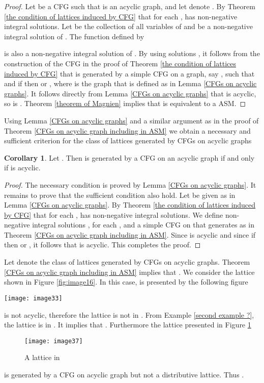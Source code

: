 \documentclass{article}
\theoremstyle{definition}
\newtheorem{coro}{Corollary}
\begin{document}
\begin{proof}
Let  be a CFG such that  is an acyclic graph, and let  denote . By Theorem \ref{the condition of lattices induced by CFG} that for each ,  has non-negative integral solutions. Let  be the collection of all variables of  and  be a non-negative integral solution of . The function  defined by

is also a non-negative integral solution of . By using solutions ,  it follows from the construction of the CFG in the proof of Theorem \ref{the condition of lattices induced by CFG} that  is generated by a simple CFG on a graph, say , such that  and if  then  or , where  is the graph that is defined as in Lemma \ref{CFGs on acyclic graphs}. It follows directly from Lemma \ref{CFGs on acyclic graphs} that   is acyclic, so is . Theorem \ref{theorem of Magnien} implies that  is equivalent to a ASM.
\end{proof}
Using Lemma \ref{CFGs on acyclic graphs} and a similar argument as in the proof of Theorem \ref{CFGs on acyclic graph including in ASM} we obtain a necessary and sufficient criterion for the class of lattices generated by CFGs on acyclic graphs
\begin{coro}
Let . Then  is generated by a CFG on an acyclic graph if and only if  is acyclic.
\end{coro}
\begin{proof}
The necessary condition is proved by Lemma \ref{CFGs on acyclic graphs}. It remains to prove that the sufficient condition also hold. Let  be given as in Lemma \ref{CFGs on acyclic graphs}. By Theorem \ref{the condition of lattices induced by CFG} that for each ,  has non-negative integral solutions. We define non-negative integral solutions ,  for each , and a simple CFG on  that generates   as in Theorem \ref{CFGs on acyclic graph including in ASM}. Since  is acyclic  and since if  then  or , it follows that  is acyclic. This completes the proof.
\end{proof}
Let  denote the class of lattices generated by CFGs on acyclic graphs. Theorem \ref{CFGs on acyclic graph including in ASM} implies that . We consider the lattice shown in Figure \ref{fig:image16}. In this case,  is presented by the following figure
\begin{center}
\texttt{[image: image33]}
\end{center}
 is not acyclic, therefore the lattice is not in . From Example \ref{second example ?}, the lattice is in . It implies that . Furthermore the lattice presented in Figure \ref{fig:image37}
\begin{figure}[h]
\centering
\texttt{[image: image37]}
\caption{A lattice in }
\label{fig:image37}
\end{figure}
is generated by a CFG on acyclic graph but not a distributive lattice. Thus .
\end{document}
